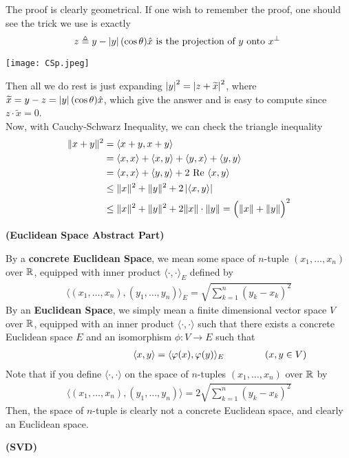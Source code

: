\documentclass{report}
\begin{document}
\begin{mdframed}
The proof is clearly geometrical. If one wish to remember the proof, one should see the trick we use is exactly 
\begin{align*}
z\triangleq y-\left|y\right|(\cos \theta )\hat{x}\text{ is the projection of $y$ onto $x^{\perp}$ }
\end{align*}
\begin{center}
   \begin{minipage}{0.9\linewidth}  
       \centering
       \texttt{[image: CSp.jpeg]}
   \end{minipage}
\end{center}
Then all we do rest is just expanding $\left|y\right|^2=\left|z+\widetilde{x}\right|^2$, where $\widetilde{x}=y-z=\left|y\right|(\cos \theta)\hat{x}$, which give the answer and is easy to compute since $z\cdot \tilde{x}=0$.\\

Now, with Cauchy-Schwarz Inequality, we can check the triangle inequality 
\begin{align*}
  \| x+y \|^2&=\langle x+y,x+y\rangle \\
&=\langle x,x\rangle +\langle x,y\rangle +\langle y,x\rangle +\langle y,y\rangle \\
&= \langle x,x\rangle + \langle y,y\rangle +2\text{ Re }\langle x,y\rangle \\
&\leq \| x \|^2 + \| y \|^2 + 2\left|\langle x,y\rangle \right|\\
&\leq \| x \|^2 + \| y \|^2 + 2\| x \|\cdot \| y \|=\Big(\| x \|+\| y \|\Big)^2
\end{align*}
\end{mdframed}
\textbf{(Euclidean Space Abstract Part)} 
\begin{mdframed}
  By a \textbf{concrete Euclidean Space}, we mean some space of $n$-tuple  $(x_1,\dots ,x_n)$ over $\mathbb{R}$, equipped with inner product  $\langle \cdot,\cdot\rangle_E$ defined by 
\begin{align*}
  \langle  (x_1,\dots,x_n)  ,(y_1,\dots ,y_n)\rangle_E= \sqrt{\sum_{k=1}^n (y_k-x_k)^2} 
\end{align*}
By an \textbf{Euclidean Space}, we simply mean a finite dimensional vector space $V$ over $\mathbb{R}$,  equipped with an inner product $\langle \cdot,\cdot\rangle $ such that there exists a concrete Euclidean space $E$ and an isomorphism  $\phi:V\to E$ such that 
\begin{align*}
\hspace{3cm}\langle x,y\rangle= \langle \phi (x),\phi (y)\rangle_E \hspace{1.5cm}(x,y \in V)
\end{align*}
Note that if you define $\langle \cdot,\cdot\rangle $ on the space of $n$-tuples $(x_1,\dots ,x_n)$ over $\mathbb{R}$ by 
\begin{align*}
  \langle  (x_1,\dots,x_n)  ,(y_1,\dots ,y_n)\rangle=2 \sqrt{\sum_{k=1}^n (y_k-x_k)^2} 
\end{align*}
Then, the space of $n$-tuple is clearly not a concrete Euclidean space, and clearly an Euclidean space. 

\end{mdframed}
\textbf{(SVD)}
\end{document}
